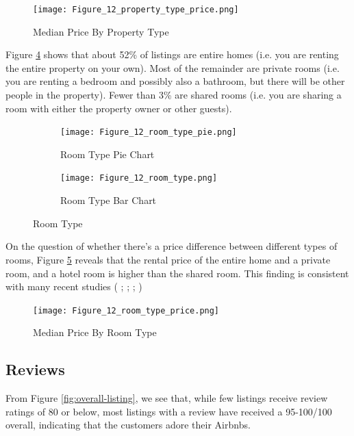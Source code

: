 \begin{figure}[H]
        \centering
        \texttt{[image: Figure\_12\_property\_type\_price.png]}
        \caption{Median Price By Property Type}
        \label{fig:property_type_price}
\end{figure}

Figure \ref{fig:room_type} shows that about 52\% of listings are entire homes
(i.e. you are renting the entire property on your own). Most of the remainder
are private rooms (i.e. you are renting a bedroom and possibly also a bathroom,
but there will be other people in the property). Fewer than 3\% are shared rooms
(i.e. you are sharing a room with either the property owner or other guests).

\begin{figure}[H]
    \centering
    \begin{subfigure}[b]{0.48\textwidth}
        \centering
        \texttt{[image: Figure\_12\_room\_type\_pie.png]}
        \caption{Room Type Pie Chart}
        \label{fig:room_type_pie}
    \end{subfigure}
    \begin{subfigure}[b]{0.48\textwidth}
        \centering
        \texttt{[image: Figure\_12\_room\_type.png]}
        \caption{Room Type Bar Chart}
        \label{fig:room_type_bar}
    \end{subfigure}
    \caption{Room Type}
    \label{fig:room_type}
\end{figure}

On the question of whether there's a price difference between different types of
rooms, Figure \ref{fig:room_type_price} reveals that the rental price of the
entire home and a private room, and a hotel room is higher than the shared room.
This finding is consistent with many recent studies (\cite{cai2019price} ;
\cite{benitez2018flexible}; \cite{chen2017consumer}; \cite{gibbs2018use})

\begin{figure}[H]
        \centering
        \texttt{[image: Figure\_12\_room\_type\_price.png]}
        \caption{Median Price By Room Type}
        \label{fig:room_type_price}
\end{figure}

\subsection{Reviews}

From Figure   \ref{fig:overall-listing}, we see that, while few listings receive
review ratings of 80 or below, most listings with a review have received a
95-100/100 overall,  indicating that the customers adore their Airbnbs.

